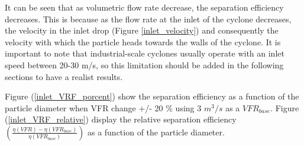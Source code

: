 It can be seen that as volumetric flow rate decrease, the separation efficiency decreases. This is because as the flow rate at the inlet of the cyclone decreases, the velocity in the inlet drop (Figure \ref{inlet_velocity}) and consequently the velocity with which the particle heads towards the walls of the cyclone. It is important to note that industrial-scale cyclones usually operate with an inlet speed between 20-30 m/s, so this limitation should be added in the following sections to have a realist results.

Figure (\ref{inlet_VRF_porcent}) show the separation efficiency as a function of the particle diameter when VFR change +/- 20 \% using 3 $m^3/s$ as a $VFR_{base}$. Figure (\ref{inlet_VRF_relative}) display the relative separation efficiency  $ \left( \frac{ \eta(VFR)-\eta(VFR_{base})}{\eta(VFR_{base})} \right)$ as a function of the particle diameter.
